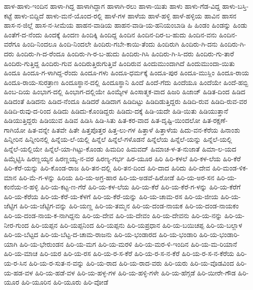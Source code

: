 ಹಾಳ-ಹಾಳು-ಇಂದಿನ
ಹಾಳಾ-ಗಿದ್ದ
ಹಾಳಾಗಿದ್ದಾಗ
ಹಾಳಾಗಿ-ರಲು
ಹಾಳಾ-ಯಿತು
ಹಾಳು
ಹಾಳು-ಗೆಡ-ವಿದ್ದ
ಹಾಳು-ಬಸ್ತಿ-ಕಟ್ಟೆ
ಹಾಳು-ಬಿದ್ದಿದೆ
ಹಾಳು-ಮನೆ-ಯೊಂದ-ರಲ್ಲಿ
ಹಾಳೆ-ಗಳ
ಹಾಳೆಯ
ಹಾಳೆ-ಹಳ್ಳಿ
ಹಾಳೆ-ಹಳ್ಳಿಯ
ಹಾವಿನ
ಹಾಸನ
ಹಾಸ-ನ-ಜಿಲ್ಲೆ
ಹಾಸ-ನ-ಸೀಮೆಯ
ಹಾಹನ-ವಾಡಿಯ
ಹಾಹನ-ವಾಡಿ-ಯ-ಹನಿಯಂಬಾಡಿ
ಹಿ
ಹಿಂಡಂ
ಹಿಂಡನ್ನು
ಹಿಂಡು
ಹಿಂತೆಗೆ-ದ-ನೆಂದು
ಹಿಂದಕ್ಕೆ
ಹಿಂದಣ
ಹಿಂದಿಕ್ಕಿ
ಹಿಂದಿದ್ದ
ಹಿಂದಿನ
ಹಿಂದಿನ-ದಿರ-ಬ-ಹುದು
ಹಿಂದಿನ-ವನು
ಹಿಂದಿನ-ವರೆಗೂ
ಹಿಂದಿ-ನಿಂದಲೂ
ಹಿಂದಿ-ನಿಂದಲೇ
ಹಿಂದಿರು-ಗಬೇ-ಕಾಯಿ-ತೆಂದು
ಹಿಂದಿರುಗಿ
ಹಿಂದಿರು-ಗಿ-ದನು
ಹಿಂದಿರು-ಗಿ-ದರು
ಹಿಂದಿರು-ಗಿ-ದ-ರೆಂದೂ
ಹಿಂದಿರು-ಗಿ-ರ-ಬ-ಹುದು
ಹಿಂದಿರು-ಗಿಸಿ
ಹಿಂದಿರು-ಗಿ-ಸಿ-ದರು
ಹಿಂದಿರು-ಗು-ತಾರೆ
ಹಿಂದಿರು-ಗುತ್ತಿದ್ದ
ಹಿಂದಿರು-ಗುವ
ಹಿಂದಿರುತ್ತಿರುಗುತ್ತಿವೆ
ಹಿಂದಿರುವ
ಹಿಂದುಮುಂದಾಗಿದೆ
ಹಿಂದುಮುಂದಾ-ಯಿತು
ಹಿಂದೂ
ಹಿಂದೂ-ಗ-ಳಾಗಿದ್ದ-ರೆಂದು
ಹಿಂದೂ-ಗಳು
ಹಿಂದೂ-ಧರ್ಮಕ್ಕೆ
ಹಿಂದೂ-ಪುರ
ಹಿಂದೂ-ಮುಸ್ಲಿಂ
ಹಿಂದೂ-ರಾಯ
ಹಿಂದೂ-ರಾಯ-ಸುರತ್ರಾಣ
ಹಿಂದೂಸ್ಥಾನ-ದಲ್ಲಿ
ಹಿಂದೂಸ್ಥಾನಿ
ಹಿಂದೆ
ಹಿಂದೆ-ಗೆದು
ಹಿಂದೆಯೂ
ಹಿಂದೆಯೇ
ಹಿಂದೆ-ಹಬ್ಬಿ
ಹಿಂಬ-ದಿಯ
ಹಿಂಭಾಗ-ದಲ್ಲಿ
ಹಿಂಭಾಗ-ದಲ್ಲಿಯೇ
ಹಿಂಮ್ಯೇಳ
ಹಿಂಸಾತ್ಮಕ-ವಾದ
ಹಿಜರಿ
ಹಿಜಾಜ್
ಹಿಡಿತ-ದಿಂದ
ಹಿಡಿದ
ಹಿಡಿದಂತೆ
ಹಿಡಿದನು
ಹಿಡಿದ-ನೆಂದೂ
ಹಿಡಿದರೆ
ಹಿಡಿದಾಗ
ಹಿಡಿದಿಟ್ಟು
ಹಿಡಿದಿಡುತ್ತಿದ್ದರು
ಹಿಡಿದಿ-ರುವ
ಹಿಡಿದಿ-ರುವ-ವರ
ಹಿಡಿದಿ-ರುವು-ದ-ರಿಂದ
ಹಿಡಿದು
ಹಿಡಿದು-ಕೊಂಡಿದ್ದರು
ಹಿಡಿದು-ದಕ್ಕೆ
ಹಿಡಿ-ಯದೇ
ಹಿಡಿ-ಯಿತು
ಹಿಡಿಯುತ್ತಾನೆ
ಹಿಡಿಯುತ್ತಿದ್ದರು
ಹಿಡಿಯುವ
ಹಿಡಿವ
ಹಿಡಿಸಿ
ಹಿಡಿ-ಸಿತು
ಹಿತ-ಕರ-ವಾದ
ಹಿತ-ದೃಷ್ಟಿ-ಯಿಂದಲೋ
ಹಿತ-ರಕ್ಷಣೆ-ಗಾಗಿಯೋ
ಹಿತ-ವನ್ನೇ
ಹಿತವೇ
ಹಿತೇ
ಹಿತ್ತಪೊತ್ತರ
ಹಿತ್ತ-ಲು-ಗಳ
ಹಿತ್ತಾಳೆ
ಹಿತ್ತಾಳೆಯ
ಹಿದು-ವನ-ಕೆರೆಯ
ಹಿನಾಂಶು
ಹಿನ್ನೀರಿನ
ಹಿನ್ನೀರಿನಲ್ಲಿ
ಹಿನ್ನೆಯ-ಲೆ-ಯಲ್ಲಿ
ಹಿನ್ನೆಲೆ
ಹಿನ್ನೆಲೆ-ಗಳೊಡನೆ
ಹಿನ್ನೆಲೆಯ
ಹಿನ್ನೆಲೆ-ಯನ್ನು
ಹಿನ್ನೆಲೆ-ಯಲ್ಲಿ
ಹಿನ್ನೆಲೆ-ಯಲ್ಲಿಯೇ
ಹಿನ್ನೆಲೆ-ಯಾ-ಗಿಟ್ಟು-ಕೊಂಡು
ಹಿಮದಿಂ
ಹಿಮವದ್
ಹಿಮಾಚ-ಳ-ತ-ನುಜಾತೆ
ಹಿಮಾ-ಲ-ಯದ
ಹಿಮ್ಮೆಟ್ಟಿಸಿ
ಹಿರಣ್ಣಯ್ಯನ
ಹಿರಣ್ಣಯ್ಯ-ನ-ವರ
ಹಿರಣ್ಯ-ಗರ್ಭ
ಹಿರ-ಯೂರ
ಹಿರಿ
ಹಿರಿ-ಕಳಲೆ
ಹಿರಿ-ಕಳ-ಲೆಯ
ಹಿರಿ-ಕೆರೆ
ಹಿರಿ-ಕೆರೆ-ಯನ್ನು
ಹಿರಿ-ಕೊಂಡ-ರಾಜ
ಹಿರಿ-ತನ-ದಲ್ಲಿ
ಹಿರಿ-ತನ-ದಿಂದ
ಹಿರಿ-ದಾದ
ಹಿರಿದು
ಹಿರಿ-ದೇವ
ಹಿರಿ-ಮಂಡ-ಳಿಕ-ಮಾನ
ಹಿರಿ-ಮೆ-ಗ-ಳನ್ನು
ಹಿರಿಯ
ಹಿರಿ-ಯ-ಅಗ್ರ-ಹಾರ
ಹಿರಿ-ಯ-ಅಡವೆ-ಹಿರೋಡೆ
ಹಿರಿ-ಯ-ಅರ-ಸನ
ಹಿರಿ-ಯ-ಕಂನೆಯ-ನ-ಹಳ್ಳಿ
ಹಿರಿ-ಯ-ಕಟ್ಟ-ಣ-ಗೆರೆ
ಹಿರಿ-ಯ-ಕಳ-ಲೆಯ
ಹಿರಿ-ಯ-ಕೆರೆ
ಹಿರಿ-ಯ-ಕೆರೆ-ಗ-ಳನ್ನು
ಹಿರಿ-ಯ-ಕೆರೆಗೆ
ಹಿರಿ-ಯ-ಕೆರೆಯ
ಹಿರಿ-ಯ-ಕೆರೆ-ಯ-ಕೆಳಗೆ
ಹಿರಿ-ಯ-ಕೆರೆ-ಯನ್ನು
ಹಿರಿ-ಯ-ಚಾಮ-ರಸ
ಹಿರಿ-ಯ-ಜೀಯ
ಹಿರಿ-ಯ-ಜೆಟ್ಟಿಗ
ಹಿರಿ-ಯ-ಜೆಟ್ಟಿಗ-ವನ್ನು
ಹಿರಿ-ಯಣ್ಣ
ಹಿರಿ-ಯ-ತಮ್ಮನ
ಹಿರಿ-ಯ-ದಂಡ-ನಾಯಕ
ಹಿರಿ-ಯ-ದಂಡ-ನಾಯಕಂ
ಹಿರಿ-ಯ-ದಂಡ-ನಾಯ-ಕ-ನಾಗಿದ್ದನು
ಹಿರಿ-ಯ-ದೇವ
ಹಿರಿ-ಯ-ದೇವಂ
ಹಿರಿ-ಯ-ದೇವನು
ಹಿರಿ-ಯ-ನನ್ನು
ಹಿರಿ-ಯ-ನೀರ-ಗುಂದ
ಹಿರಿ-ಯಪ್ಪನ
ಹಿರಿ-ಯಪ್ಪನಿಂದ
ಹಿರಿ-ಯಪ್ಪನು
ಹಿರಿ-ಯಪ್ರಧಾನ
ಹಿರಿ-ಯ-ಬಯಿಚಪ್ಪ
ಹಿರಿ-ಯ-ಬಲ್ಲಾಳ
ಹಿರಿ-ಯ-ಬೆಟ್ಟದ
ಹಿರಿ-ಯ-ಬೆಟ್ಟ-ದ-ಚಾಮ-ರಾಜನು
ಹಿರಿ-ಯ-ಭಂಡಾರದ
ಹಿರಿ-ಯ-ಭಂಡಾರಿ
ಹಿರಿ-ಯ-ಭಂಡಾರಿ-ಯಾಗಿ
ಹಿರಿ-ಯ-ಭೇರುಂಡನ
ಹಿರಿ-ಯ-ಮಗ
ಹಿರಿ-ಯ-ಮರಳಿ
ಹಿರಿ-ಯ-ಮರ-ಳಿ-ಇಂದಿನ
ಹಿರಿ-ಯ-ಮ-ರಿಯಾನೆ
ಹಿರಿ-ಯ-ಮಾಚ
ಹಿರಿ-ಯರ
ಹಿರಿ-ಯ-ರಸ
ಹಿರಿ-ಯ-ರ-ಸ-ಕೆರೆ
ಹಿರಿ-ಯ-ರ-ಸ-ನ-ಕೆರೆ
ಹಿರಿ-ಯ-ರ-ಸ-ನ-ಕೆರೆಯ
ಹಿರಿ-ಯ-ರ-ಸಿನ
ಹಿರಿ-ಯ-ರ-ಸುತ-ನ-ವನ್ನು
ಹಿರಿ-ಯ-ರಾದ
ಹಿರಿ-ಯ-ರಾದ-ವರು
ಹಿರಿ-ಯರು
ಹಿರಿ-ಯ-ವೊಡವಿಂದ
ಹಿರಿ-ಯ-ಹಡ-ವಳ
ಹಿರಿ-ಯ-ಹಡೆ-ವಳ
ಹಿರಿ-ಯ-ಹಳ್ಳ-ಗಳ
ಹಿರಿ-ಯ-ಹಳ್ಳಿ-ಗಳೇ
ಹಿರಿ-ಯ-ಹೆಗ್ಗಡೆ
ಹಿರಿ-ಯೀರೇ-ಗೌಡ
ಹಿರಿ-ಯೂರ
ಹಿರಿ-ಯೂರಿನ
ಹಿರಿ-ಯೂರು
ಹಿರಿ-ವೋಡೆ
